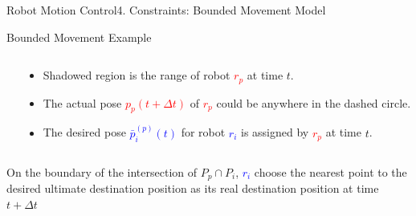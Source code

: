 \documentclass[10pt]{beamer}
\begin{document}
\begin{frame}{Robot Motion Control}{4. Constraints: Bounded Movement Model}
\begin{block}{Bounded Movement Example}
\begin{columns}[T]
\begin{column}{.5\textwidth}
      \end{column}%
      \begin{column}{.45\textwidth}
        \begin{itemize}
        \item Shadowed region is the range of robot
          \textcolor{red}{$r_p$} at time $t$.
        \item The actual pose \textcolor{red}{$p_p(t+\Delta{t})$} of
          \textcolor{red}{$r_p$} could be anywhere in the dashed
          circle.
        \item The desired pose \textcolor{blue}{$\bar{p}_i^{(p)}(t)$}
          for robot \textcolor{blue}{$r_i$} is assigned by
          \textcolor{red}{$r_p$} at time $t$.
        \end{itemize}         
      \end{column}%
    \end{columns}
    On the boundary of the intersection of $P_p \cap P_i$,
    \textcolor{blue}{$r_i$} choose the nearest point to the desired
    ultimate destination position as its real destination position at
    time $t+\Delta{t}$
  \end{block}
\end{frame}
\end{document}
